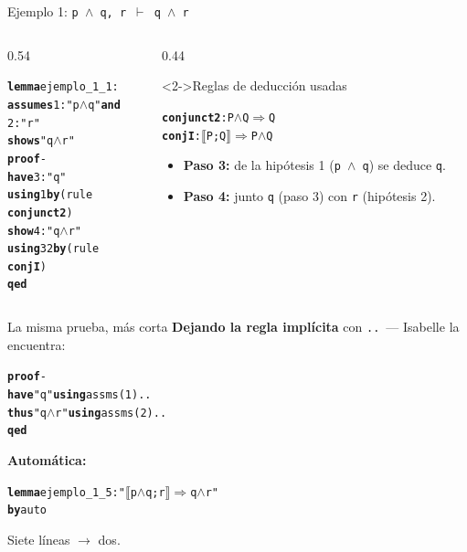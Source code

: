 \documentclass[11pt,aspectratio=169]{beamer}
\newcommand{\sAnd}{\(\wedge\)}
\newcommand{\sMeta}{\(\Longrightarrow\)}
\newcommand{\sTurn}{\(\vdash\)}
\newcommand{\sLb}{\(\llbracket\)}
\newcommand{\sRb}{\(\rrbracket\)}
\newcommand{\kw}[1]{\textcolor{isaCmd}{\textbf{#1}}}
\newcommand{\str}[1]{\textcolor{isaStr}{#1}}
\newcommand{\Rn}[1]{\textcolor{granate}{\textbf{#1}}}
\newcommand{\R}[1]{{\setlength{\fboxsep}{1pt}%
  \colorbox{resalte}{\ttfamily\bfseries\textcolor{granate}{#1}}}}
\begin{document}
\begin{frame}[fragile]{Ejemplo 1: \texttt{p \sAnd{} q, r \sTurn{} q \sAnd{} r}}
  \begin{columns}[T]
    \begin{column}{0.54\textwidth}
\begin{alltt}\footnotesize
\kw{lemma} ejemplo_1_1:
  \kw{assumes} 1: \str{"p \sAnd{} q"} \kw{and}
          2: \str{"r"}
  \kw{shows} \str{"q \sAnd{} r"}
\kw{proof} -
  \kw{have} 3: \str{"q"}
    \kw{using} 1 \kw{by} (rule \R{conjunct2})
  \kw{show} 4: \str{"q \sAnd{} r"}
    \kw{using} 3 2 \kw{by} (rule \R{conjI})
\kw{qed}
\end{alltt}
    \end{column}
    \begin{column}{0.44\textwidth}
      \begin{block}<2->{Reglas de deducción usadas}
\begin{alltt}\scriptsize
\Rn{conjunct2}: P \sAnd{} Q \sMeta{} Q
\Rn{conjI}: \sLb{}P; Q\sRb{} \sMeta{} P \sAnd{} Q
\end{alltt}
\end{block}
      \footnotesize
      \begin{itemize}
        \item<3-> \textbf{Paso 3:} de la hipótesis 1
          (\texttt{p \sAnd{} q}) se deduce \texttt{q}.
        \item<4-> \textbf{Paso 4:} junto \texttt{q} (paso 3) con
          \texttt{r} (hipótesis 2).
      \end{itemize}
    \end{column}
  \end{columns}
\end{frame}

\begin{frame}[fragile]{La misma prueba, más corta}
  \textbf{Dejando la regla implícita} con \texttt{..}\ --- Isabelle la
  encuentra:
\begin{alltt}\footnotesize
\kw{proof} -
  \kw{have} \str{"q"} \kw{using} assms(1) ..
  \kw{thus} \str{"q \sAnd{} r"} \kw{using} assms(2) ..
\kw{qed}
\end{alltt}
  \pause
  \textbf{Automática:}
\begin{alltt}\footnotesize
\kw{lemma} ejemplo_1_5: \str{"\sLb{}p \sAnd{} q; r\sRb{} \sMeta{} q \sAnd{} r"}
\kw{by} auto
\end{alltt}
  \vspace{0.4em}
  \pause
  \begin{center}
    \alert{Siete líneas $\longrightarrow$ dos.}\\
  \end{center}
\end{frame}
\end{document}
